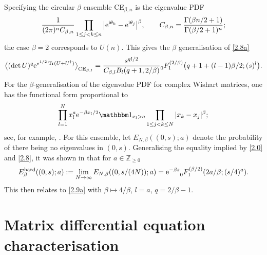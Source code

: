 \documentclass[pdftex]{sigma}
\numberwithin{equation}{section}
\theoremstyle{definition}
\begin{document}
Specifying the circular $\beta$ ensemble CE${}_{\beta,n}$ is the eigenvalue PDF
\begin{equation}\label{CB}
{1 \over (2 \pi)^n C_{\beta,n}}
\prod_{1 \le j < k \le n}
\big|{\rm e}^{{\rm i} \theta_k} - {\rm e}^{{\rm i} \theta_j} \big|^\beta, \qquad C_{\beta,n} = {\Gamma(\beta n/2+1) \over \Gamma(\beta/2+1)^n};
\end{equation}
the case $\beta =2$ corresponds to $U(n)$.
This gives the $\beta$ generalisation of \eqref{2.8a}
\begin{equation}\label{2.9a}
\big \langle (\det U)^q {\rm e}^{s^{1/2} \operatorname{Tr}(U + U^\dagger)} \big \rangle_{{\rm CE}_{\beta,l}} =
{s^{q l/2} \over C_{\beta,l} B_l(q+1,2/\beta)}
{\vphantom{F}}_0^{\mathstrut} F_1^{(2/\beta)}\bigl(q+1 + (l-1)\beta/2 ;(s)^l\bigr).
\end{equation}
For the $\beta$-generalisation of the eigenvalue PDF for complex Wishart matrices, one has the functional form proportional to
\[%
\prod_{l=1}^N x_l^a {\rm e}^{-\beta x_l/2}
\mathbbm 1_{x_l > o} \prod_{1 \le j < k \le N} |x_k - x_j|^\beta;
\]
see, for example, \cite[equation~(3.16) with $a$ appropriately identified]{Fo10}. For this ensemble, let $E_{N,\beta}((0,s); a)$ denote the probability of there being no eigenvalues in $(0,s)$. Generalising the equality implied by \eqref{2.0} and \eqref{2.8}, it was shown in \cite{Fo93c} that for $a \in \mathbb Z_{\ge 0}$
\[%
E_{\beta}^{\rm hard}((0,s);a) :=
\lim_{N \to \infty} E_{N,\beta}((0,s/(4N));a) =
{\rm e}^{-\beta s}
{\vphantom{F}}_0^{\mathstrut} F_1^{(\beta/2)}(2 a/\beta ;(s/4)^a).
\]
This then relates to \eqref{2.9a} with $\beta \mapsto 4/\beta$,
$l=a$, $q=2/\beta - 1$.


\section{Matrix differential equation characterisation}\label{sec3}
\end{document}
